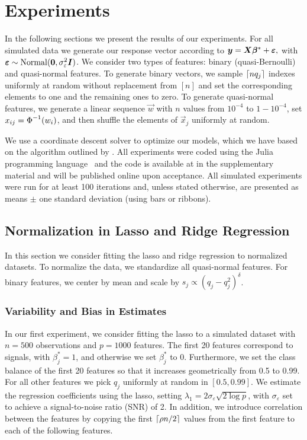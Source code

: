 \section{Experiments}
\label{sec:experiments}

In the following sections we present the results of our experiments. For all simulated data
we generate our response vector according to \(\bm{y} = \bm{X}\bm{\beta}^* +
\bm{\varepsilon},\) with \(\bm{\varepsilon} \sim \operatorname{Normal}(\bm{0}, \sigma_\varepsilon^2
\bm{I})\). We consider two types of features: binary (quasi-Bernoulli) and quasi-normal
features. To generate binary vectors, we sample \(\lceil nq_j \rceil\) indexes uniformly at random
without replacement from \([n]\) and set the corresponding elements to one and the
remaining ones to zero. To generate quasi-normal features, we generate a linear sequence
\(\vec{w}\) with \(n\) values from \(10^{-4}\) to \(1 - 10^{-4}\), set \(x_{ij} =
\operatorname{\Phi}^{-1}(w_i)\), and then shuffle the elements of \(\vec{x}_j\) uniformly at random.

We use a coordinate descent solver to optimize our models, which we have based on the
algorithm outlined by \citet{friedman2010}. All experiments were coded using the Julia
programming language~\citep{bezanson2017} and the code is available at
in the supplementary material and will be published online upon acceptance.
%
All simulated experiments were run for at least 100 iterations and, unless stated
otherwise, are presented as means $\pm$ one standard deviation (using bars or ribbons).

\subsection{Normalization in Lasso and Ridge Regression}%
\label{sec:experiments-lassoridge}

In this section we consider fitting the lasso and ridge regression to normalized datasets.
To normalize the data, we standardize all quasi-normal features. For binary features, we
center by mean and scale by \(s_j \propto (q_j-q_j^2)^\delta\).

\subsubsection{Variability and Bias in Estimates}

In our first experiment, we consider fitting the lasso to a simulated dataset with
\(n=500\) observations and \(p = \num{1000}\) features. The first 20 features correspond to
signals, with \(\beta_j^* = 1\), and otherwise we set \(\beta_j^*\) to 0. Furthermore, we
set the class balance of the first 20 features so that it increases geometrically from 0.5
to 0.99. For all other features we pick \(q_j\) uniformly at random in \([0.5,0.99]\). We
estimate the regression coefficients using the lasso, setting \(\lambda_1 = 2
\sigma_\varepsilon \sqrt{2 \log p }\), with \(\sigma_\varepsilon\) set to achieve a
signal-to-noise ratio (SNR) of 2. In addition, we introduce correlation between the
features by copying the first \(\lceil \rho n/2 \rceil\) values from the first feature to each of
the following features.

